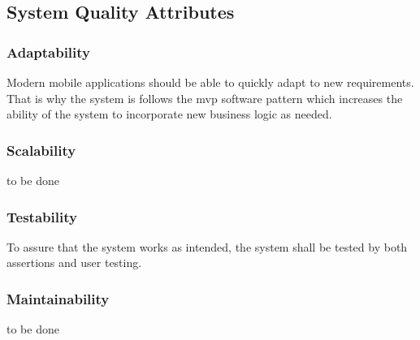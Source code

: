     \subsection{System Quality Attributes}
        
        \subsubsection{Adaptability}
        Modern mobile applications should be able to quickly adapt to new requirements. That is why the system is follows the \gls{mvp} software pattern which increases the ability of the system to incorporate new business logic as needed.
        
        \subsubsection{Scalability}
        to be done
        
        \subsubsection{Testability}
        To assure that the system works as intended, the system shall be tested by both assertions and user testing. 
        
        \subsubsection{Maintainability}
        to be done
    
    
    